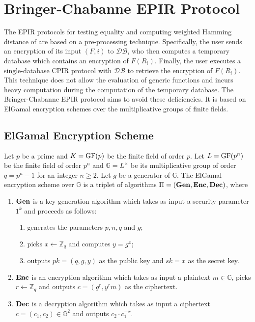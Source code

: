 \documentclass[JMC]{degruyter-journal}
\begin{document}
\section{Bringer-Chabanne EPIR Protocol  }

The EPIR protocols for testing equality and computing weighted
Hamming distance of \cite{BCPT07} are based on a  pre-processing
technique. Specifically, the user  sends an encryption of its input
$(F,i)$ to $\mathcal{DB}$, who then computes a temporary database
which contains  an encryption of $F(R_i)$. Finally, the user
executes a
 single-database CPIR protocol with $\mathcal{DB}$ to retrieve the encryption of $F(R_i)$.
This technique does not
allow the evaluation of  generic functions and incurs heavy
computation during the computation of the temporary database. The
Bringer-Chabanne EPIR protocol   aims to
 avoid these deficiencies. It is based on  ElGamal encryption schemes  over the multiplicative groups
 of finite fields.




\subsection{ElGamal Encryption Scheme}\label{sec:elgamal}

Let $p$ be a prime and $K={\rm GF}(p)$ be the finite field of order
$p$. Let $L={\rm GF}(p^n)$ be the
 finite field of order $p^n$  and $\mathbb{G}=L^{\times}$ be its  multiplicative group  of order $q=p^n-1$
for an integer $n\geq 2$. Let $g$ be a generator of $\mathbb{G}$.
The ElGamal encryption scheme over  $\mathbb{G}$ is a triplet of  algorithms $\Pi=({\bf Gen, Enc, Dec})$,
where
\begin{enumerate}
\item ${\bf Gen}$ is a key generation algorithm which takes as input a security parameter $1^k$ and proceeds as follows:
        \begin{enumerate}
             \item  generates the parameters $p,n,q$ and $ g$;
             \item  picks $x\leftarrow \mathbb{Z}_q$  and computes $y=g^x$;
            \item   outputs $pk=(q,g,y)$ as the public key and $sk=x$ as  the secret key.
       \end{enumerate}

\item $\bf Enc$ is an encryption algorithm which takes as input a plaintext $m\in \mathbb{G}$, picks
 $r\leftarrow\mathbb{Z}_q$  and outputs   $c=(g^r,y^rm)$ as the ciphertext.
\item   ${\bf Dec}$ is a decryption algorithm which  takes as input a ciphertext $c=(c_1,c_2)\in \mathbb{G}^2$ and outputs
$c_2\cdot c_1^{-x}$.
\end{enumerate}
\end{document}
